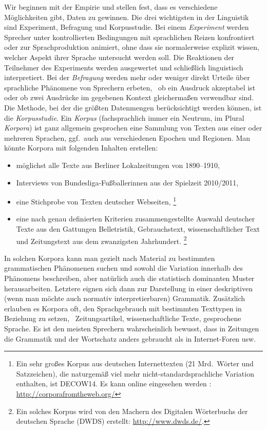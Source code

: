 Wir beginnen mit der Empirie und stellen fest, dass es verschiedene Möglichkeiten gibt, Daten zu gewinnen.
Die drei wichtigsten in der Linguistik sind Experiment, Befragung und Korpusstudie.
Bei einem \textit{Experiment} werden Sprecher unter kontrollierten Bedingungen mit sprachlichen Reizen konfrontiert oder zur Sprachproduktion animiert, ohne dass sie normalerweise explizit wissen, welcher Aspekt ihrer Sprache untersucht werden soll.
Die Reaktionen der Teilnehmer des Experiments werden ausgewertet und schließlich linguistisch interpretiert.
Bei der \textit{Befragung} werden mehr oder weniger direkt Urteile über sprachliche Phänomene von Sprechern erbeten, \zB\ ob ein Ausdruck akzeptabel ist oder ob zwei Ausdrücke im gegebenen Kontext gleichermaßen verwendbar sind.
Die Methode, bei der die größten Datenmengen berücksichtigt werden können, ist die \textit{Korpusstudie}.
Ein \textit{Korpus} (fachsprachlich immer ein Neutrum, im Plural \textit{Korpora}) ist ganz allgemein gesprochen eine Sammlung von Texten aus einer oder mehreren Sprachen, ggf.\ auch aus verschiedenen Epochen und Regionen.
Man könnte \zB Korpora mit folgenden Inhalten erstellen:


\begin{itemize}\Lf
  \item möglichst alle Texte aus Berliner Lokalzeitungen von 1890--1910,
  \item Interviews von Bundesliga-Fußballerinnen aus der Spielzeit 2010\slash 2011,
  \item eine Stichprobe von Texten deutscher Webseiten,%
		\footnote{Ein sehr großes Korpus aus deutschen Internettexten (21 Mrd.\ Wörter und Satzzeichen), die naturgemäß viel mehr nicht-standardsprachliche Variation enthalten, ist DECOW14.
		Es kann online eingesehen werden \citep{SchaeferBildhauer2012a}: \url{http://corporafromtheweb.org/}}
  \item eine nach genau definierten Kriterien zusammengestellte Auswahl deutscher Texte aus den Gattungen Belletristik, Gebrauchstext, wissenschaftlicher Text und Zeitungstext aus dem zwanzigsten Jahrhundert.%
		\footnote{Ein solches Korpus wird von den Machern des Digitalen Wörterbuchs der deutschen Sprache (DWDS) erstellt: \url{http://www.dwds.de/}.}
\end{itemize}

In solchen Korpora kann man gezielt nach Material zu bestimmten grammatischen Phänomenen suchen und sowohl die Variation innerhalb des Phänomens beschreiben, aber natürlich auch die statistisch dominanten Muster herausarbeiten.
Letztere eignen sich dann zur Darstellung in einer deskriptiven (wenn man möchte auch normativ interpretierbaren) Grammatik.
Zusätzlich erlauben es Korpora oft, den Sprachgebrauch mit bestimmten Texttypen in Beziehung zu setzen, \zB\ Zeitungsartikel, wissenschaftliche Texte, gesprochene Sprache.
Es ist den meisten Sprechern wahrscheinlich bewusst, dass in Zeitungen die Grammatik und der Wortschatz anders gebraucht als in Internet-Foren usw.


